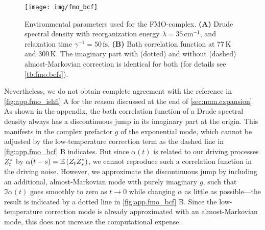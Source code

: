  \begin{figure}
    \centering
    \texttt{[image: img/fmo\_bcf]}
    \caption{%
      Environmental parameters used for the FMO-complex.
      \textbf{(A)} Drude spectral density with reorganization energy $\lambda = 35\,\mathrm{cm^{-1}}$, and relaxation time $\gamma^{-1} = 50\,\mathrm{fs}$.
      \textbf{(B)} Bath correlation function at 77\,K and 300\,K.
      The imaginary part with (dotted) and without (dashed) almost-Markovian correction is identical for both (for details see \autoref{tb:fmo.bcfs}).
    }
    \label{fig:app.fmo_bcf}
  \end{figure}

Nevertheless, we do not obtain complete agreement with the reference in \autoref{fig:app.fmo_ishfl} A for the reason discussed at the end of \autoref{sec:num.expansion}.
As shown in the appendix, the bath correlation function of a Drude spectral density always has a discontinuous jump in its imaginary part at the origin.
This manifests in the complex prefactor $g$ of the exponential mode, which cannot be adjusted by the low-temperature correction term as the dashed line in \autoref{fig:app.fmo_bcf} B indicates.
But since $\alpha(t)$ is related to our driving processes ${Z}^*_t$ by $\alpha(t-s) = \E[Z_t \ZZ_s]$, we cannot reproduce such a correlation function in the driving noise.
However, we approximate the discontinuous jump by including an additional, almost-Markovian mode with purely imaginary $g$, such that $\Im\alpha(t)$ goes smoothly to zero as $t \to 0$ while changing $\alpha$ as little as possible---the result is indicated by a dotted line in \autoref{fig:app.fmo_bcf} B.
Since the low-temperature correction mode is already approximated with an almost-Markovian mode, this does not increase the computational expense.\\


